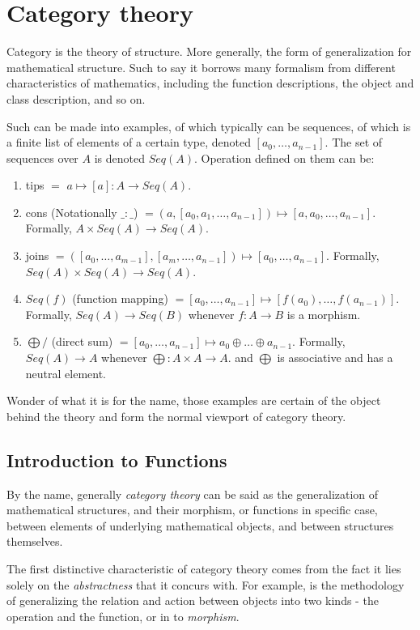 \chapter{Category theory}

Category is the theory of structure. More generally, the form of generalization for mathematical structure. Such to say it borrows many formalism from different characteristics of mathematics, including the function descriptions, the object and class description, and so on. 

Such can be made into examples, of which typically can be sequences, of which is a finite list of elements of a certain type, denoted $[a_{0},\dots,a_{n-1}]$. The set of sequences over $A$ is denoted $Seq(A)$. Operation defined on them can be:
\begin{enumerate} 
    \item tips $=$ $a\mapsto [a]:A\to Seq(A)$. 
    \item cons (Notationally $\_ :\_$) $= (a,[a_{0},a_{1},\dots,a_{n-1}])\mapsto[a,a_{0},\dots,a_{n-1}]$. Formally, $A\times Seq(A)\to Seq(A)$.     
    \item joins $= ([a_{0},\dots,a_{m-1}],[a_{m},\dots,a_{n-1}])\mapsto[a_{0},\dots,a_{n-1}]$. Formally, $Seq(A)\times Seq(A)\to Seq(A)$. 
    \item $Seq(f)$ (function mapping) $= [a_{0},\dots,a_{n-1}]\mapsto[f(a_{0}),\dots,f(a_{n-1})]$. Formally, $Seq(A)\to Seq(B)$ whenever $f:A\to B$ is a morphism. 
    \item $\bigoplus /$ (direct sum) $=[a_{0},\dots,a_{n-1}]\mapsto a_{0}\oplus\dots \oplus a_{n-1}$. Formally, $Seq(A)\to A$ whenever $\bigoplus:A\times A\to A$. and $\bigoplus$ is associative and has a neutral element. 
\end{enumerate}
Wonder of what it is for the name, those examples are certain of the object behind the theory and form the normal viewport of category theory. 
\section{Introduction to Functions}

By the name, generally \textit{category theory} can be said as the generalization of mathematical structures, and their morphism, or functions in specific case, between elements of underlying mathematical objects, and between structures themselves. 

The first distinctive characteristic of category theory comes from the fact it lies solely on the \textit{abstractness} that it concurs with. For example, is the methodology of generalizing the relation and action between objects into two kinds - the operation and the function, or in to \textit{morphism}. 

